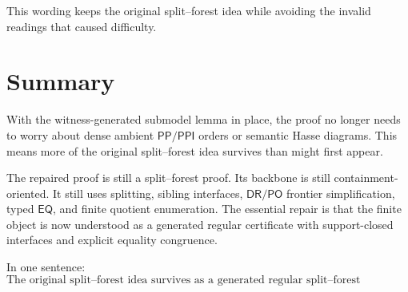 \documentclass[11pt]{article}
\newcommand{\PP}{\mathsf{PP}}
\newcommand{\PPI}{\mathsf{PPI}}
\newcommand{\PO}{\mathsf{PO}}
\newcommand{\DR}{\mathsf{DR}}
\newcommand{\EQ}{\mathsf{EQ}}
\theoremstyle{definition}
\theoremstyle{plain}
\begin{document}
This wording keeps the original split--forest idea while avoiding the invalid readings that caused difficulty.

\section{Summary}

With the witness-generated submodel lemma in place, the proof no longer needs to worry about dense ambient $\PP/\PPI$ orders or semantic Hasse diagrams.  This means more of the original split--forest idea survives than might first appear.

The repaired proof is still a split--forest proof.  Its backbone is still containment-oriented.  It still uses splitting, sibling interfaces, $\DR/\PO$ frontier simplification, typed $\EQ$, and finite quotient enumeration.  The essential repair is that the finite object is now understood as a generated regular certificate with support-closed interfaces and explicit equality congruence.

In one sentence:
\[
\boxed{\text{The original split--forest idea survives as a generated regular split--forest certificate theorem.}}
\]
\end{document}
